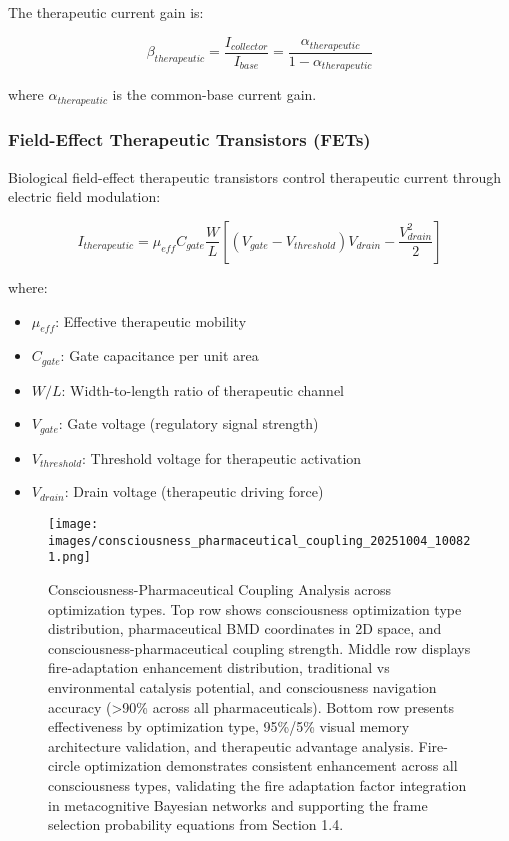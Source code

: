 \documentclass[12pt,a4paper]{article}
\begin{document}
The therapeutic current gain is:

\begin{equation}
\beta_{therapeutic} = \frac{I_{collector}}{I_{base}} = \frac{\alpha_{therapeutic}}{1 - \alpha_{therapeutic}}
\end{equation}

where $\alpha_{therapeutic}$ is the common-base current gain.

\subsubsection{Field-Effect Therapeutic Transistors (FETs)}

Biological field-effect therapeutic transistors control therapeutic current through electric field modulation:

\begin{equation}
I_{therapeutic} = \mu_{eff} C_{gate} \frac{W}{L} \left[(V_{gate} - V_{threshold})V_{drain} - \frac{V_{drain}^2}{2}\right]
\end{equation}

where:
\begin{itemize}
\item $\mu_{eff}$: Effective therapeutic mobility
\item $C_{gate}$: Gate capacitance per unit area
\item $W/L$: Width-to-length ratio of therapeutic channel
\item $V_{gate}$: Gate voltage (regulatory signal strength)
\item $V_{threshold}$: Threshold voltage for therapeutic activation
\item $V_{drain}$: Drain voltage (therapeutic driving force)
\end{itemize}


\begin{figure}[htbp]
    \centering
    \texttt{[image: images/consciousness\_pharmaceutical\_coupling\_20251004\_100821.png]}
    \caption{Consciousness-Pharmaceutical Coupling Analysis across optimization types. Top row shows consciousness optimization type distribution, pharmaceutical BMD coordinates in 2D space, and consciousness-pharmaceutical coupling strength. Middle row displays fire-adaptation enhancement distribution, traditional vs environmental catalysis potential, and consciousness navigation accuracy (>90\% across all pharmaceuticals). Bottom row presents effectiveness by optimization type, 95\%/5\% visual memory architecture validation, and therapeutic advantage analysis. Fire-circle optimization demonstrates consistent enhancement across all consciousness types, validating the fire adaptation factor integration in metacognitive Bayesian networks and supporting the frame selection probability equations from Section 1.4.}
    \label{fig:consciousness_coupling}
    \end{figure}
\end{document}

